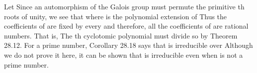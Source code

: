 \documentclass[11pt,oneside]{article}
\begin{document}
\begin{BookBody}
Let  Since an automorphism of the Galois group  must permute the primitive th roots of unity, we see that  where   is the polynomial extension of  Thus the coefficients of  are fixed by every  and therefore, all the coefficients of  are rational numbers. That is,  The th cyclotomic polynomial  must divide  so   by Theorem 28.12. For  a prime number, Corollary 28.18 says that  is irreducible over  Although we do not prove it here, it can be shown that  is irreducible even when  is not a prime number.

\end{BookBody}

\BookNarrativetrue
\end{document}
